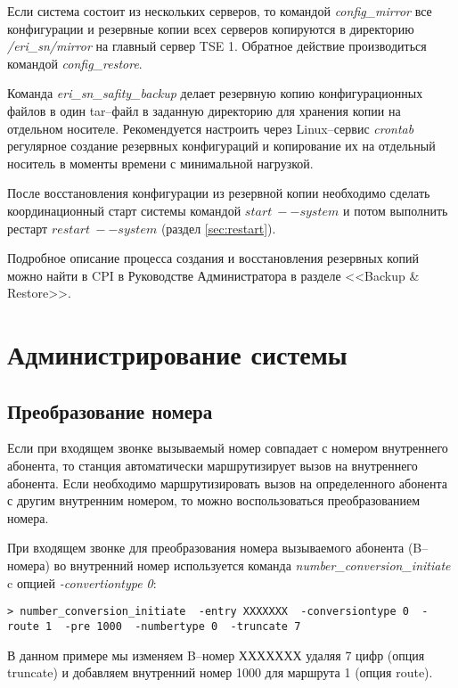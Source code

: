 Если система состоит из нескольких серверов, то командой {\em config\_mirror} все конфигурации и резервные копии всех серверов копируются в директорию {\em /eri\_sn/mirror} на главный сервер TSE 1. Обратное действие производиться командой {\em config\_restore}.

Команда {\em eri\_sn\_safity\_backup} делает резервную копию конфигурационных файлов в один tar--файл в заданную директорию для хранения копии на отдельном носителе. Рекомендуется настроить через Linux--сервис {\em crontab} регулярное создание резервных конфигураций и копирование их на отдельный носитель в моменты времени с минимальной нагрузкой.

После восстановления конфигурации из резервной копии необходимо сделать координационный старт системы командой $start\ --system$ и потом выполнить рестарт $restart\ --system$ (раздел \ref{sec:restart}). 

Подробное описание процесса создания и восстановления резервных копий можно найти в CPI в Руководстве Администратора \cite{admin_guide} в разделе <<Backup \& Restore>>.
\clearpage 


\section{Администрирование системы}

\subsection{Преобразование номера}

Если при входящем звонке вызываемый номер совпадает с номером внутреннего абонента, то станция автоматически маршрутизирует вызов на внутреннего абонента. Если необходимо маршрутизировать вызов на определенного абонента с другим внутренним номером, то можно воспользоваться преобразованием номера. 

При входящем звонке для преобразования номера вызываемого абонента (B--номера) во внутренний номер используется команда {\em number\_conversion\_initiate} c опцией {\em -convertiontype 0}:
\begin{lstlisting}
> number_conversion_initiate  -entry XXXXXXX  -conversiontype 0  -route 1  -pre 1000  -numbertype 0  -truncate 7
\end{lstlisting}

В данном примере мы изменяем B--номер ХХХХХХХ удаляя 7 цифр (опция truncate) и добавляем внутренний номер 1000 для маршрута 1 (опция route).

